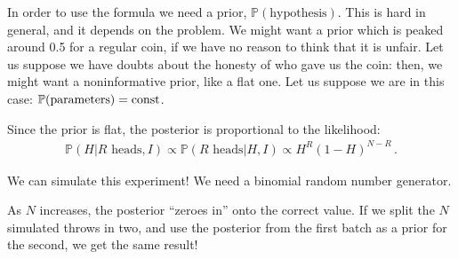 \documentclass[main.tex]{subfiles}
\begin{document}
In order to use the formula we need a prior, \(\mathbb{P}(\text{hypothesis})\). This is hard in general, and it depends on the problem. 
We might want a prior which is peaked around \num{.5} for a regular coin, if we have no reason to think that it is unfair. 
Let us suppose we have doubts about the honesty of who gave us the coin: then, we might want a noninformative prior, like a flat one. 
Let us suppose we are in this case: \(\mathbb{P}(\text{parameters}) = \text{const}\).

Since the prior is flat, the posterior is proportional to the likelihood: 
%
\begin{align}
\mathbb{P}(H | R \text{ heads}, I) \propto 
\mathbb{P}(R \text{ heads} | H, I)
\propto H^{R} (1 - H)^{N-R}  
\,.
\end{align}

We can simulate this experiment! We need a binomial random number generator.


As \(N\) increases, the posterior ``zeroes in'' onto the correct value.
If we split the \(N\) simulated throws in two, and use the posterior from the first batch as a prior for the second, we get the same result!

\end{document}
